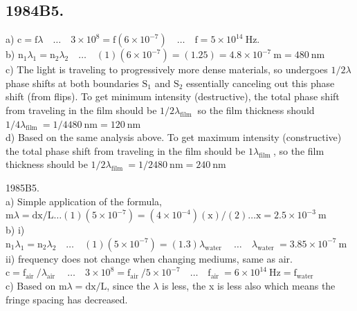 \begin{enumerate}
\section*{1984B5.}
a) $\mathrm{c}=\mathrm{f} \lambda \quad \ldots \quad 3 \times 10^{8}=\mathrm{f}\left(6 \times 10^{-7}\right) \quad \ldots \quad \mathrm{f}=5 \times 10^{14} \mathrm{~Hz}$.\\
b) $\mathrm{n}_{1} \lambda_{1}=\mathrm{n}_{2} \lambda_{2} \quad \ldots \quad(1)\left(6 \times 10^{-7}\right)=(1.25)=4.8 \times 10^{-7} \mathrm{~m}=480 \mathrm{~nm}$\\
c) The light is traveling to progressively more dense materials, so undergoes $1 / 2 \lambda$ phase shifts at both boundaries $\mathrm{S}_{1}$ and $\mathrm{S}_{2}$ essentially canceling out this phase shift (from flips). To get minimum intensity (destructive), the total phase shift from traveling in the film should be $1 / 2 \lambda_{\text {film }}$ so the film thickness should $1 / 4 \lambda_{\text {film }}=1 / 4480 \mathrm{~nm}=120 \mathrm{~nm}$\\
d) Based on the same analysis above. To get maximum intensity (constructive) the total phase shift from traveling in the film should be $1 \lambda_{\text {film }}$, so the film thickness should be $1 / 2 \lambda_{\text {film }}=1 / 2480 \mathrm{~nm}=240 \mathrm{~nm}$

1985B5.\\
a) Simple application of the formula, $\mathrm{m} \lambda=\mathrm{dx} / \mathrm{L} \ldots(1)\left(5 \times 10^{-7}\right)=\left(4 \times 10^{-4}\right)(\mathrm{x}) /(2) \ldots \mathrm{x}=2.5 \times 10^{-3} \mathrm{~m}$\\
b) i) $\mathrm{n}_{1} \lambda_{1}=\mathrm{n}_{2} \lambda_{2} \quad \ldots \quad(1)\left(5 \times 10^{-7}\right)=(1.3) \lambda_{\text {water }} \quad \ldots \quad \lambda_{\text {water }}=3.85 \times 10^{-7} \mathrm{~m}$\\
ii) frequency does not change when changing mediums, same as air.\\
$\mathrm{c}=\mathrm{f}_{\text {air }} / \lambda_{\text {air }} \quad \ldots \quad 3 \times 10^{8}=\mathrm{f}_{\text {air }} / 5 \times 10^{-7} \quad \ldots \quad \mathrm{f}_{\text {air }}=6 \times 10^{14} \mathrm{~Hz}=\mathrm{f}_{\text {water }}$\\
c) Based on $\mathrm{m} \lambda=\mathrm{dx} / \mathrm{L}$, since the $\lambda$ is less, the x is less also which means the fringe spacing has decreased.


\end{enumerate}
